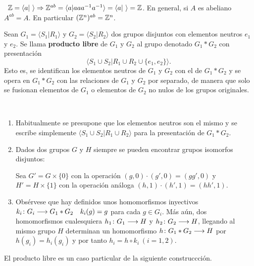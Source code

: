 \documentclass[GTSResumen.tex]{subfiles}
\begin{document}
\begin{ej}\
$\mathbb{Z}=\langle a|\ \rangle\Rightarrow \mathbb{Z}^{ab}=\langle a| aaa^{-1}a^{-1}\rangle=\langle a|\ \rangle =\mathbb{Z}$. En general, si $A$ es abeliano $A^{ab}=A$. En particular $(\mathbb{Z}^n)^{ab}=\mathbb{Z}^n$.
\end{ej}

\begin{defi}
Sean $G_1=\langle S_1|R_1\rangle$ y $G_2=\langle S_2|R_2\rangle$ dos grupos disjuntos con elementos neutros $e_1$ y $e_2$. Se llama \textbf{producto libre} de $G_1$ y $G_2$ al grupo denotado $G_1*G_2$ con presentación
\[
\langle S_1\cup S_2|R_1\cup R_2\cup\{e_1,e_2\}\rangle.
\]
Esto es, se identifican los elementos neutros de $G_1$ y $G_2$ con el de $G_1*G_2$ y se opera en $G_1*G_2$ con las relaciones de $G_1$ y $G_2$ por separado, de manera que solo se fusionan elementos de $G_1$ o elementos de $G_2$ no nulos de los grupos originales.
\end{defi}

\begin{nota}\
\begin{enumerate}
\item Habitualmente se presupone que los elementos neutros son el mismo y se escribe simplemente $\langle S_1\cup S_2|R_1\cup R_2\rangle$ para la presentación de $G_1*G_2$.
\item Dados dos grupos $G$ y $H$ siempre se pueden encontrar grupos isomorfos disjuntos:

Sea $G'=G\times\{0\}$ con la operación $(g,0)\cdot(g',0)=(gg',0)$ y $H'=H\times\{1\}$ con la operación análoga $(h,1)\cdot(h',1)=(hh',1)$.
\item Obsérvese que hay definidos unos homomorfismos inyectivos $k_i\colon{G_i}\longrightarrow{G_1*G_2}\quad k_i(g)=g$ para cada $g\in G_i$. Más aún, dos homomorfismos cualesquiera $h_1\colon{G_1}\longrightarrow{H}$ y $h_2\colon{G_2}\longrightarrow{H}$, llegando al mismo grupo $H$ determinan un homomorfismo $h\colon{G_1*G_2}\longrightarrow{H}$ por $h(g_i)=h_i(g_i)$ y por tanto $h_i=h\circ k_i\ (i=1,2)$.
\end{enumerate}
\end{nota}
\begin{comment}
\begin{ej}\
\begin{enumerate}
\item $\Z\underbrace{*\cdots *}_{n\ veces}\Z: \langle a_1,\dots,a_n|\ \rangle$. Grupo libre con base $a_1,\dots,a_n$.
\item $\Z*\Z_2: \langle a,b|b^2\rangle$.
\item $\Z_n*\Z_m: \langle a,b| a^n,b^m\rangle$.
\item $(G_1*G_2)^{ab}=G_1^{ab}\times G_2^{ab}$. 
\end{enumerate}
\end{ej}
\end{comment}
El producto libre es un caso particular de la siguiente construccción.  
\end{document}
